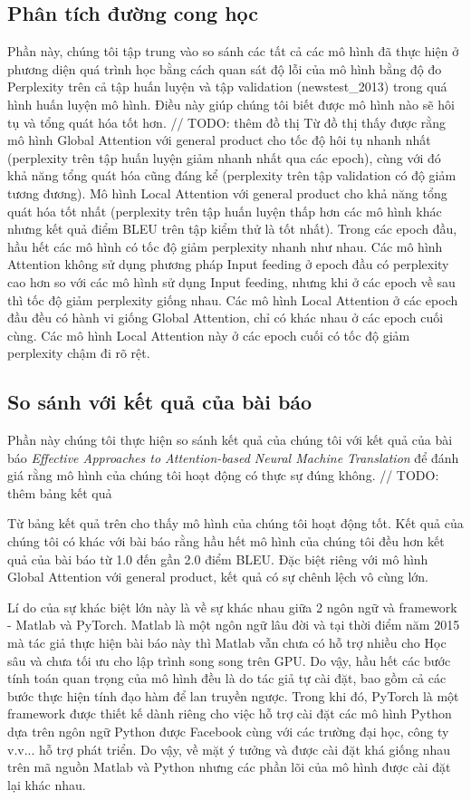 \subsection{Phân tích đường cong học}
Phần này, chúng tôi tập trung vào so sánh các tất cả các mô hình đã thực hiện ở phương diện quá trình học bằng cách quan sát độ lỗi của mô hình bằng độ đo Perplexity trên cả tập huấn luyện và tập validation (newstest\_2013) trong quá hình huấn luyện mô hình. Điều này giúp chúng tôi biết được mô hình nào sẽ hôi tụ và tổng quát hóa tốt hơn.
// TODO: thêm đồ thị
Từ đồ thị thấy được rằng mô hình Global Attention với general product cho tốc độ hôi tụ nhanh nhất (perplexity trên tập huấn luyện giảm nhanh nhất qua các epoch), cùng với đó khả năng tổng quát hóa cũng đáng kể (perplexity trên tập validation có độ giảm tương đương). Mô hình Local Attention với general product cho khả năng tổng quát hóa tốt nhất (perplexity trên tập huấn luyện thấp hơn các mô hình khác nhưng kết quả điểm BLEU trên tập kiểm thử là tốt nhất). Trong các epoch đầu, hầu hết các mô hình có tốc độ giảm perplexity nhanh như nhau. Các mô hình Attention không sử dụng phương pháp Input feeding ở epoch đầu có perplexity cao hơn so với các mô hình sử dụng Input feeding, nhưng khi ở các epoch về sau thì tốc độ giảm perplexity giống nhau. Các mô hình Local Attention ở các epoch đầu đều có hành vi giống Global Attention, chỉ có khác nhau ở các epoch cuối cùng. Các mô hình Local Attention này ở các epoch cuối có tốc độ giảm perplexity chậm đi rõ rệt.

\subsection{So sánh với kết quả của bài báo}
Phần này chúng tôi thực hiện so sánh kết quả của chúng tôi với kết quả của bài báo \textit{Effective Approaches to Attention-based Neural Machine Translation} để đánh giá rằng mô hình của chúng tôi hoạt động có thực sự đúng không.
// TODO: thêm bảng kết quả

Từ bảng kết quả trên cho thấy mô hình của chúng tôi hoạt động tốt. Kết quả của chúng tôi có khác với bài báo rằng hầu hết mô hình của chúng tôi đều hơn kết quả của bài báo từ 1.0 đến gần 2.0 điểm BLEU. Đặc biệt riêng với mô hình Global Attention với general product, kết quả có sự chênh lệch vô cùng lớn.

Lí do của sự khác biệt lớn này là về sự khác nhau giữa 2 ngôn ngữ và framework - Matlab và PyTorch. Matlab là một ngôn ngữ lâu đời và tại thời điểm năm 2015 mà tác giả thực hiện bài báo này thì Matlab vẫn chưa có hỗ trợ nhiều cho Học sâu và chưa tối ưu cho lập trình song song trên GPU. Do vậy, hầu hết các bước tính toán quan trọng của mô hình đều là do tác giả tự cài đặt, bao gồm cả các bước thực hiện tính đạo hàm để lan truyền ngược. Trong khi đó, PyTorch là một framework được thiết kế dành riêng cho việc hỗ trợ cài đặt các mô hình Python dựa trên ngôn ngữ Python được Facebook cùng với các trường đại học, công ty v.v... hỗ trợ phát triển. Do vậy, về mặt ý tưởng và được cài đặt khá giống nhau trên mã nguồn Matlab và Python nhưng các phần lõi của mô hình được cài đặt lại khác nhau.

